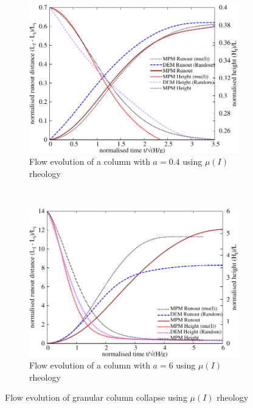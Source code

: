 \begin{figure}[tbhp]
\centering
\begin{subfigure}[b]{0.975\textwidth}
\includegraphics[width=\textwidth]{flowa04muI}
\caption{Flow evolution of a column with $a=0.4$ using $\mu(I)$ rheology}
\label{fig:flowa04muI}
\end{subfigure}
\\
\begin{subfigure}[b]{0.975\textwidth}
\centering
\includegraphics[width=\textwidth]{flowa6muI}
\caption{Flow evolution of a column with $a=6$ using $\mu(I)$ rheology}
\label{fig:flowa6muI}
\end{subfigure}
\caption{Flow evolution of granular column collapse using $\mu(I)$ rheology}
\label{fig:flow_muI}
\end{figure}


